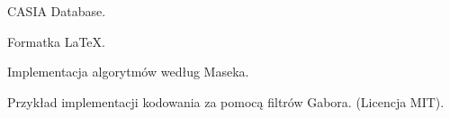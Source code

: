 {\begin{enumerate}[{[}A{]}]
	\item \label{web:CASIA} CASIA Database. \\

	\item \label{web:CASIA} Formatka LaTeX. \\

  \item \label{web:masekImplementation} Implementacja algorytmów według Maseka. \\

  \item \label{web:gaborImpl} Przykład implementacji kodowania za pomocą filtrów Gabora. (Licencja MIT). \\

\end{enumerate}
}
